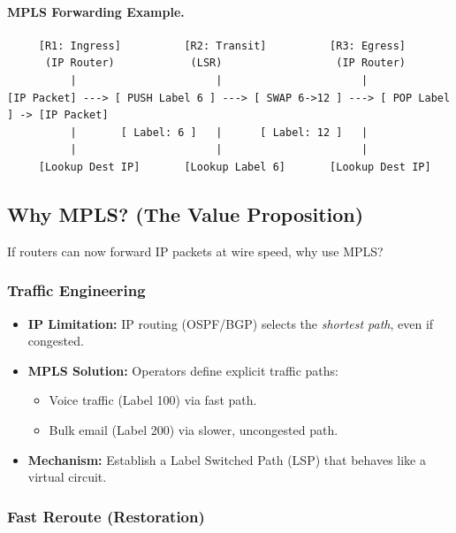 \documentclass[12pt]{article}
\begin{document}
\paragraph{MPLS Forwarding Example.}

\begin{verbatim}
     [R1: Ingress]          [R2: Transit]          [R3: Egress]
      (IP Router)            (LSR)                  (IP Router)
          |                      |                      |
[IP Packet] ---> [ PUSH Label 6 ] ---> [ SWAP 6->12 ] ---> [ POP Label ] -> [IP Packet]
          |       [ Label: 6 ]   |      [ Label: 12 ]   |
          |                      |                      |
     [Lookup Dest IP]       [Lookup Label 6]       [Lookup Dest IP]
\end{verbatim}

\subsection{Why MPLS? (The Value Proposition)}

If routers can now forward IP packets at wire speed, why use MPLS?

\subsubsection{Traffic Engineering}

\begin{itemize}
    \item \textbf{IP Limitation:}
          IP routing (OSPF/BGP) selects the \emph{shortest path}, even if congested.
    \item \textbf{MPLS Solution:}
          Operators define explicit traffic paths:
          \begin{itemize}
              \item Voice traffic (Label 100) via fast path.
              \item Bulk email (Label 200) via slower, uncongested path.
          \end{itemize}
    \item \textbf{Mechanism:}
          Establish a Label Switched Path (LSP) that behaves like a virtual circuit.
\end{itemize}

\subsubsection{Fast Reroute (Restoration)}
\end{document}
